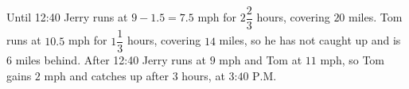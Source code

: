 Until 12:40 Jerry runs at $9-1.5=7.5$ mph for $2\dfrac{2}{3}$ hours, covering $20$ miles. Tom runs at $10.5$ mph for $1\dfrac{1}{3}$ hours, covering $14$ miles, so he has not caught up and is $6$ miles behind. After 12:40 Jerry runs at $9$ mph and Tom at $11$ mph, so Tom gains $2$ mph and catches up after $3$ hours, at $\boxed{\text{3:40 P.M.}}$
